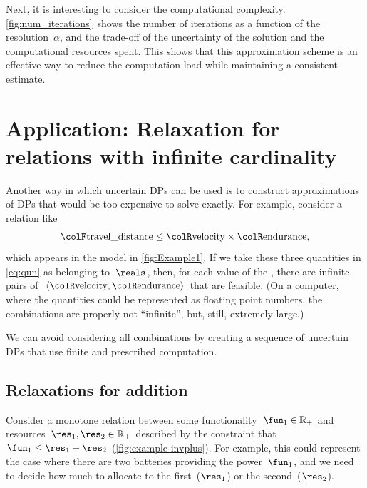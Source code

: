 Next, it is interesting to consider the computational complexity.
\cref{fig:num_iterations}~shows the number of iterations as
a function of the resolution~$\alpha$, and the trade-off of the
uncertainty of the solution and the computational resources spent.
This shows that this approximation scheme is an effective way to reduce
the computation load while maintaining a consistent estimate.


\section{Application: Relaxation for relations with infinite cardinality\label{sec:Application-relax}}

Another way in which uncertain DPs can be used is to construct approximations
of DPs that would be too expensive to solve exactly. For example,
consider a relation like
\begin{equation}
{\colF\text{travel\_distance}}\leq{\colR\text{velocity}}\times{\colR\text{endurance}},\label{eq:qun}
\end{equation}
which appears in the model in \cref{fig:Example1}. If we take
these three quantities in \cref{eq:qun} as belonging to~$\reals$,
then, for each value of the , there are infinite
pairs of~$\left\langle {\colR\text{velocity}},{\colR\text{endurance}}\right\rangle $
that are feasible. (On a computer, where the quantities could be represented
as floating point numbers, the combinations are properly not ``infinite'',
but, still, extremely large.)

We can avoid considering all combinations by creating a sequence of
uncertain DPs that use finite and prescribed computation.

\subsection{Relaxations for addition}

Consider a monotone relation between some functionality~$\fun_{1}\in\mathbb{R}_{+}$
and resources~$\res_{1},\res_{2}\in\mathbb{R}_{+}$ described by
the constraint that~$\fun_{1}\leq\res_{1}+\res_{2}$ (\cref{fig:example-invplus}).
For example, this could represent the case where there are two batteries
providing the power~$\fun_{1}$, and we need to decide how much to
allocate to the first~($\res_{1}$) or the second~($\res_{2}$).


